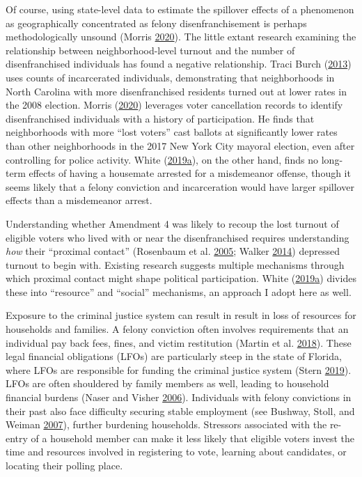 \documentclass[
  12pt,
]{article}
\begin{document}
Of course, using state-level data to estimate the spillover effects of a phenomenon as geographically concentrated as felony disenfranchisement is perhaps methodologically unsound (Morris \protect\hyperlink{ref-Morris2020}{2020}). The little extant research examining the relationship between neighborhood-level turnout and the number of disenfranchised individuals has found a negative relationship. Traci Burch (\protect\hyperlink{ref-Burch2013}{2013}) uses counts of incarcerated individuals, demonstrating that neighborhoods in North Carolina with more disenfranchised residents turned out at lower rates in the 2008 election. Morris (\protect\hyperlink{ref-Morris2020}{2020}) leverages voter cancellation records to identify disenfranchised individuals with a history of participation. He finds that neighborhoods with more ``lost voters'' cast ballots at significantly lower rates than other neighborhoods in the 2017 New York City mayoral election, even after controlling for police activity. White (\protect\hyperlink{ref-White2019a}{2019}\protect\hyperlink{ref-White2019a}{a}), on the other hand, finds no long-term effects of having a housemate arrested for a misdemeanor offense, though it seems likely that a felony conviction and incarceration would have larger spillover effects than a misdemeanor arrest.

Understanding whether Amendment 4 was likely to recoup the lost turnout of eligible voters who lived with or near the disenfranchised requires understanding \emph{how} their ``proximal contact'' (Rosenbaum et al. \protect\hyperlink{ref-Rosenbaum2005}{2005}; Walker \protect\hyperlink{ref-Walker2014}{2014}) depressed turnout to begin with. Existing research suggests multiple mechanisms through which proximal contact might shape political participation. White (\protect\hyperlink{ref-White2019a}{2019}\protect\hyperlink{ref-White2019a}{a}) divides these into ``resource'' and ``social'' mechanisms, an approach I adopt here as well.

Exposure to the criminal justice system can result in result in loss of resources for households and families. A felony conviction often involves requirements that an individual pay back fees, fines, and victim restitution (Martin et al. \protect\hyperlink{ref-Martin2018}{2018}). These legal financial obligations (LFOs) are particularly steep in the state of Florida, where LFOs are responsible for funding the criminal justice system (Stern \protect\hyperlink{ref-Stern2019}{2019}). LFOs are often shouldered by family members as well, leading to household financial burdens (Naser and Visher \protect\hyperlink{ref-Naser2006}{2006}). Individuals with felony convictions in their past also face difficulty securing stable employment (see Bushway, Stoll, and Weiman \protect\hyperlink{ref-Bushway2007}{2007}), further burdening households. Stressors associated with the re-entry of a household member can make it less likely that eligible voters invest the time and resources involved in registering to vote, learning about candidates, or locating their polling place.
\end{document}
